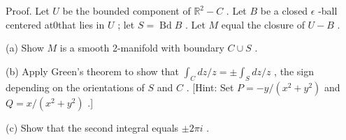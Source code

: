\documentclass[10pt]{article}
\begin{document}
Proof. Let \(U\) be the bounded component of \({\mathbb{R}}^{2} - C\) . Let \(B\) be a closed \(\epsilon\) -ball centered at0that lies in \(U\) ; let \(S = \operatorname{Bd}B\) . Let \(M\) equal the closure of \(U - B\) .

(a) Show \(M\) is a smooth 2-manifold with boundary \(C \cup  S\) .

(b) Apply Green’s theorem to show that \({\int }_{C}{dz}/z =  \pm  {\int }_{S}{dz}/z\) , the sign depending on the orientations of \(S\) and \(C\) . [Hint: Set \(P =  - y/\left( {{x}^{2} + {y}^{2}}\right)\) and \(Q = x/\left( {{x}^{2} + {y}^{2}}\right)\) .]

(c) Show that the second integral equals \(\pm  {2\pi i}\) .
\end{document}
